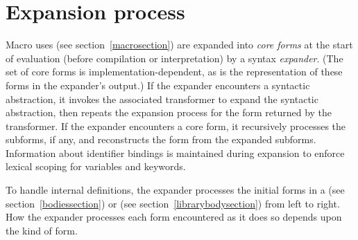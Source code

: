 \chapter{Expansion process}
\label{expansionchapter}

Macro uses (see section~\ref{macrosection}) are expanded into \textit{core
forms} at the start of evaluation (before compilation or interpretation)
by a syntax \emph{expander}.
(The set of core forms is implementation-dependent, as is the
representation of these forms in the expander's output.)
If the expander encounters a syntactic abstraction, it invokes
the associated transformer to expand the syntactic abstraction, then
repeats the expansion process for the form returned by the transformer.
If the expander encounters a core form, it recursively
processes the subforms, if any, and reconstructs the form from the
expanded subforms.
Information about identifier bindings is maintained during expansion
to enforce lexical scoping for variables and keywords.

To handle internal definitions, the expander processes the initial
forms in a  (see section~\ref{bodiessection}) or
 (see section~\ref{librarybodysection})
from left to
right.  How the expander processes each form encountered as it does so
depends upon the kind of form.

